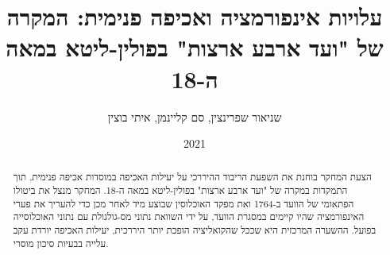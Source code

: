 \title{ עלויות אינפורמציה ואכיפה פנימית: המקרה של "ועד ארבע ארצות" בפולין-ליטא במאה ה-18}
\author{שניאור שפרינצין, סם קליינמן, איתי בוצין}
\date{2021}
  \maketitle
\begin{abstract}
  הצעת המחקר בוחנת את השפעת הריבוד ההיררכי על יעילות האכיפה במוסדות אכיפה פנימית, תוך התמקדות במקרה של "ועד ארבע ארצות" בפולין-ליטא במאה ה-18. המחקר מנצל את ביטולו הפתאומי של הוועד ב-1764 ואת מפקד האוכלוסין שבוצע מיד לאחר מכן כדי להעריך את פערי האינפורמציה שהיו קיימים במסגרת הוועד, על ידי השוואת נתוני מס-גולגולת עם נתוני האוכלוסייה בפועל.
  ההשערה המרכזית היא שככל שהקואליציה הופכת יותר היררכית, יעילות האכיפה יורדת עקב עלייה בבעיות סיכון מוסרי. \end{abstract}

